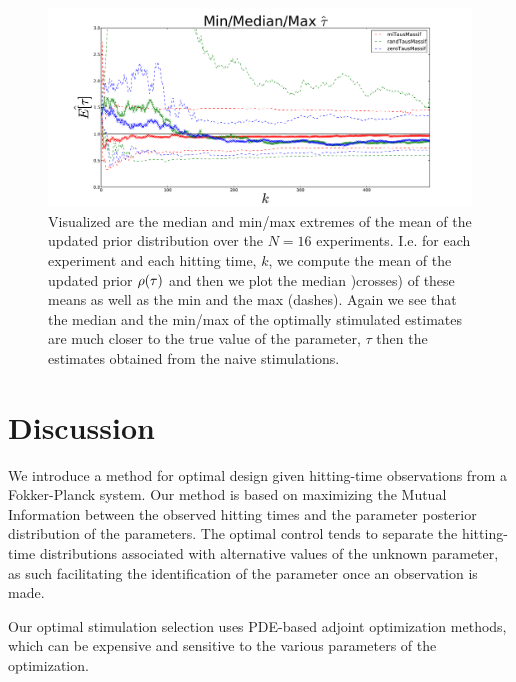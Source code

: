 \documentclass{article}
\begin{document}
\begin{figure}[htp]
\begin{center}
  \includegraphics[width=\textwidth]{Figs/HTOnlineEstimator/aggregated_belief_distn_distn_quantile_evolution.pdf}
  \caption[Quantiles of the Mean Estimates]{Visualized are the median and
  min/max extremes of the mean of the updated prior distribution over the
  $N=16$ experiments. I.e. for each experiment and each hitting time, $k$, we
  compute the mean of the updated prior $\rho({ \tau })$ and then we plot the median
  )crosses) of these means as well as the min and the max (dashes). Again we see
  that the median and the min/max of the optimally stimulated estimates are much closer to the
  true value of the parameter, $\tau$ then the estimates obtained from the
  naive stimulations.}
  \label{fig:online_optimization_quantiles_belief_evolution}
\end{center}
\end{figure}

\section{Discussion}
\label{sec:discussion}
We introduce a method for optimal design given hitting-time observations from a
Fokker-Planck system. Our method is based on maximizing the Mutual Information
between the observed hitting times and the parameter posterior distribution
of the parameters. The optimal control tends to separate
the hitting-time distributions associated with alternative values of the unknown
parameter, as such facilitating the identification of the parameter once an
observation is made. 

Our optimal stimulation selection uses PDE-based adjoint
optimization methods, which can be expensive and sensitive to the various
parameters of the optimization. 
\end{document}
